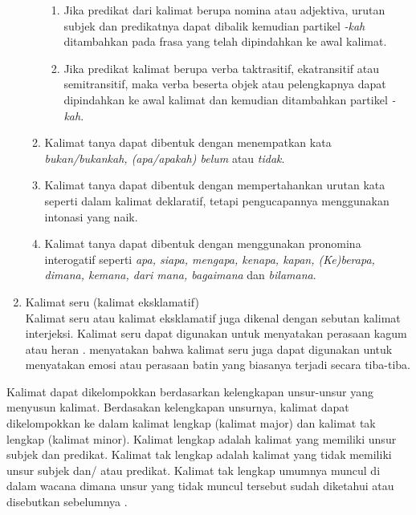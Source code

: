 \begin{enumerate}
\begin{enumerate}
\begin{enumerate}
			\item Jika predikat dari kalimat berupa nomina atau adjektiva, urutan subjek dan predikatnya dapat dibalik kemudian partikel \emph{-kah} ditambahkan pada frasa yang telah dipindahkan ke awal kalimat.

			\item Jika predikat kalimat berupa verba taktrasitif, ekatransitif atau semitransitif, maka verba beserta objek atau pelengkapnya dapat dipindahkan ke awal kalimat dan kemudian ditambahkan partikel \emph{-kah}.
		\end{enumerate}

		\item Kalimat tanya dapat dibentuk dengan menempatkan kata \emph{bukan/bukankah, (apa/apakah) belum} atau \emph{tidak}.

		\item Kalimat tanya dapat dibentuk dengan mempertahankan urutan kata seperti dalam kalimat deklaratif, tetapi pengucapannya menggunakan intonasi yang naik.

		\item Kalimat tanya dapat dibentuk dengan menggunakan pronomina interogatif seperti \emph{apa, siapa, mengapa, kenapa, kapan, (Ke)berapa, dimana, kemana, dari mana, bagaimana} dan \emph{bilamana}.
	\end{enumerate}

	\item Kalimat seru (kalimat eksklamatif)\\
	Kalimat seru atau kalimat eksklamatif juga dikenal dengan sebutan kalimat interjeksi. Kalimat seru dapat digunakan untuk menyatakan perasaan kagum atau heran \citep{alwi}. \citet{chaer} menyatakan bahwa kalimat seru juga dapat digunakan untuk menyatakan emosi atau perasaan batin yang biasanya terjadi secara tiba-tiba.
\end{enumerate}

Kalimat dapat dikelompokkan berdasarkan kelengkapan unsur-unsur yang menyusun kalimat. Berdasakan kelengkapan unsurnya, kalimat dapat dikelompokkan ke dalam kalimat lengkap (kalimat major) dan kalimat tak lengkap (kalimat minor). Kalimat lengkap adalah kalimat yang memiliki unsur subjek dan predikat. Kalimat tak lengkap adalah kalimat yang tidak memiliki unsur subjek dan/ atau predikat. Kalimat tak lengkap umumnya muncul di dalam wacana dimana unsur yang tidak muncul tersebut sudah diketahui atau disebutkan sebelumnya \citep{alwi}.
